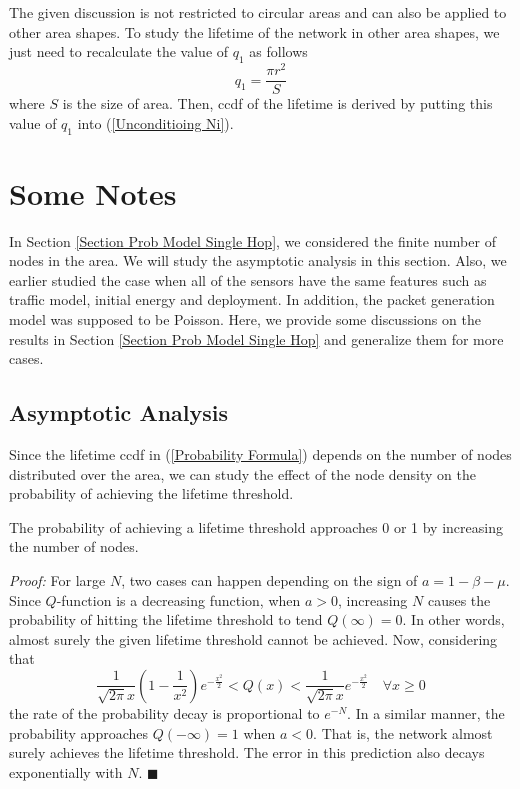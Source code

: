 \documentclass[conference]{IEEEtran}
\begin{document}
The given discussion is not restricted to circular areas and can
also be applied to other area shapes. To study the lifetime of the
network in other area shapes, we just need to recalculate the value
of $q_1$ as follows
\begin{equation}\label{q1 other area shapes}
q_1 = \frac{\pi r^2}{S}
\end{equation}
where $S$ is the size of area. Then, ccdf of the lifetime is derived
by putting this value of $q_1$ into (\ref{Unconditioing Ni}).

\section{Some Notes} \label{Section Extnesion}
In Section \ref{Section Prob Model Single Hop}, we considered the
finite number of nodes in the area. We will study the asymptotic
analysis in this section. Also, we earlier studied the case when all
of the sensors have the same features such as traffic model, initial
energy and deployment. In addition, the packet generation model was
supposed to be Poisson. Here, we provide some discussions on the
results in Section \ref{Section Prob Model Single Hop} and
generalize them for more cases.

\subsection{Asymptotic Analysis}
Since the lifetime ccdf in (\ref{Probability Formula}) depends on
the number of nodes distributed over the area, we can study the
effect of the node density on the probability of achieving the
lifetime threshold.

\corol \label{Corollary on node density} The probability of
achieving a lifetime threshold approaches 0 or 1 by increasing the
number of nodes.

\textit{Proof:} For large $N$, two cases can happen depending on the
sign of $a = 1 - \beta - \mu$. Since $Q$-function is a decreasing
function, when $a
> 0$, increasing $N$ causes the probability of hitting the lifetime
threshold to tend $Q(\infty) = 0$. In other words, almost surely the
given lifetime threshold cannot be achieved. Now, considering that
\cite{Salehi_Commsystems}
\begin{equation}
\frac{1}{\sqrt{2\pi}x}\left(1 - \frac{1}{x^2}\right)
e^{-\frac{x^2}{2}} < Q(x) < \frac{1}{\sqrt{2\pi}x}
e^{-\frac{x^2}{2}} \quad \forall x\geq  0
\end{equation}
the rate of the probability decay is proportional to $e^{-N}$. In a
similar manner, the probability approaches $Q(-\infty) = 1$ when $a
< 0$. That is, the network almost surely achieves the lifetime
threshold. The error in this prediction also decays exponentially
with $N$. \hfill $\blacksquare$
\end{document}

